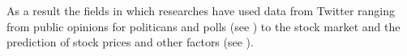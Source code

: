 As a result the fields in which researches have used data from Twitter ranging from public opinions for politicans and polls (see \cite{Oconnor2010a,Patodkar2016a}) to the stock market and the prediction of stock prices and other factors (see \cite{Bollen2011a,Mittal2012a,Nguyen2015a,Pagolu2016a,Zhang2011a}).

